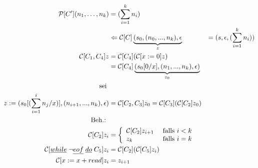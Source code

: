 \documentclass[ngerman,a4paper]{report}
\begin{document}
\begin{align*}
\mathcal{P}[C'] (n_1,\dots,n_k) &= (\sum_{i=1}^k n_i)\\
&\Leftarrow \mathcal{C}[C] \underbrace{(s_0, (n_0,...,n_k),\epsilon}_z &=(s,\epsilon,(\sum_{i=1}^k n_i))\\
\mathcal{C}[C_1,C_4] z &= \mathcal{C}[C_4](\mathcal{C}[x:=0]z)\\
&= \mathcal{C}[C_4] \underbrace{(s_0[0/x],(n_1,...,n_k),\epsilon)}_{z_0}\\
\text{sei } \\z:= (s_0[(\sum_{i=1}^i n_j/x)], (n_{i+1},...,n_k), \epsilon) &= \mathcal{C}[C_2,C_3]z_0 = \mathcal{C}[C_3](\mathcal{C}[C_2]z_0)\\
\text{Beh.: }\\ \mathcal{C}[C_2]z_i &= \left\lbrace\begin{array}{l l} \mathcal{C}[C_2] z_{i+1}&\text{ falls } i < k \\ z_k &\text{ falls } i = k \end{array}\right.\\
\mathcal{C}[\underline{while}\;\lnot\underline{eof}\;\underline{do}\;C_5] z_i &= \mathcal{C}[C_2](\mathcal{C}[C_5]z_i)\\
\mathcal{C}[x:=x+read]z_i &= z_{i+1}\\
\end{align*}
\end{document}
